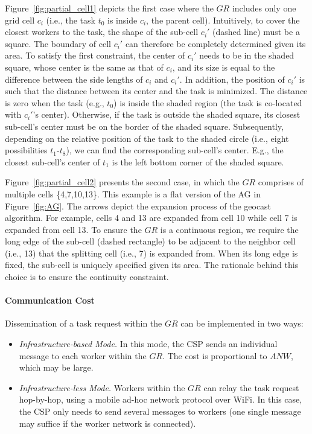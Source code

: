 \documentclass{USC-Thesis}
\numberwithin{equation}{chapter}
\begin{document}
Figure~\ref{fig:partial_cell1} depicts the first case where the $\mathit{GR}$ includes only one grid cell $c_i$ (i.e., the task $t_0$ is inside $c_i$, the parent cell). Intuitively, to cover the closest workers to the task, the shape of the sub-cell $c_i'$ (dashed line) must be a square. The boundary of cell $c_i'$ can therefore be completely determined given its area. To satisfy the first constraint, the center of $c_i'$ needs to be in the shaded square, whose center is the same as that of $c_i$, and its size is equal to the difference between the side lengths of $c_i$ and $c_i'$. In addition, the position of $c_i'$ is such that the distance between its center and the task is minimized. The distance is zero when the task (e.g., $t_0$) is inside the shaded region (the task is co-located with $c_i'$'s center). Otherwise, if the task is outside the shaded square, its closest sub-cell's center must be on the border of the shaded square. Subsequently, depending on the relative position of the task to the shaded circle (i.e., eight possibilities $t_1$-$t_8$), we can find the corresponding sub-cell's center. E.g., the closest sub-cell's center of $t_1$ is the left bottom corner of the shaded square.

Figure~\ref{fig:partial_cell2} presents the second case, in which the $\mathit{GR}$ comprises of multiple cells \{4,7,10,13\}. This example is a flat version of the AG in Figure~\ref{fig:AG}. The arrows depict the expansion process of the geocast algorithm. For example, cells 4 and 13 are expanded from cell 10 while cell 7 is expanded from cell 13. To ensure the $\mathit{GR}$ is a continuous region, we require the long edge of the sub-cell (dashed rectangle) to be adjacent to the neighbor cell (i.e., 13) that the splitting cell (i.e., 7) is expanded from. When its long edge is fixed, the sub-cell is uniquely specified given its area. The rationale behind this choice is to ensure the continuity constraint. 

\paragraph{Communication Cost}
\label{sec:shape}
Dissemination of a task request within the $\mathit{GR}$ can be implemented in two ways:
\begin{itemize}
\item
{\em Infrastructure-based Mode.} In this mode, the CSP sends an individual message to each worker within the $\mathit{GR}$. The cost is proportional to $\mathit{ANW}$, which may be large.
\item
{\em Infrastructure-less Mode.} Workers within the $\mathit{GR}$ can relay the task request hop-by-hop, using a mobile ad-hoc network protocol over WiFi. In this case, the CSP only needs to send several messages to workers (one single message may suffice if the worker network is connected).  
\end{itemize}
\end{document}
